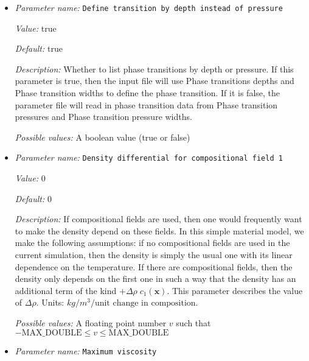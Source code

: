 \begin{itemize}
{\it Possible values:} A list of 0 to 4294967295 elements where each element is [An integer $n$ such that $0\leq n \leq 2147483647$]
\item {\it Parameter name:} {\tt Define transition by depth instead of pressure}
\label{parameters:Material model/Latent heat/Define transition by depth instead of pressure}


{\it Value:} true


{\it Default:} true


{\it Description:} Whether to list phase transitions by depth or pressure. If this parameter is true, then the input file will use Phase transitions depths and Phase transition widths to define the phase transition. If it is false, the parameter file will read in phase transition data from Phase transition pressures and Phase transition pressure widths.


{\it Possible values:} A boolean value (true or false)
\item {\it Parameter name:} {\tt Density differential for compositional field 1}
\label{parameters:Material model/Latent heat/Density differential for compositional field 1}


{\it Value:} 0


{\it Default:} 0


{\it Description:} If compositional fields are used, then one would frequently want to make the density depend on these fields. In this simple material model, we make the following assumptions: if no compositional fields are used in the current simulation, then the density is simply the usual one with its linear dependence on the temperature. If there are compositional fields, then the density only depends on the first one in such a way that the density has an additional term of the kind $+\Delta \rho \; c_1(\mathbf x)$. This parameter describes the value of $\Delta \rho$. Units: $kg/m^3/\textrm{unit change in composition}$.


{\it Possible values:} A floating point number $v$ such that $-\text{MAX\_DOUBLE} \leq v \leq \text{MAX\_DOUBLE}$
\item {\it Parameter name:} {\tt Maximum viscosity}
\label{parameters:Material model/Latent heat/Maximum viscosity}



\end{itemize}

